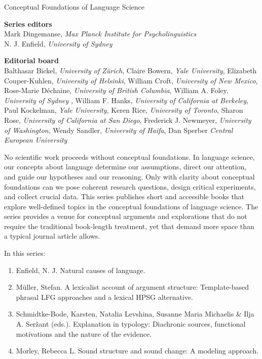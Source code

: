 {\large Conceptual Foundations of Language Science}

\bigskip

\textbf{Series editors}\\
Mark Dingemanse, \textit{Max Planck Institute for Psycholinguistics}   \\
N. J. Enfield, \textit{University of Sydney}


\bigskip


\textbf{Editorial board}\\
Balthasar Bickel, \textit{University of Zürich},
Claire Bowern, \textit{Yale University},
Elizabeth Couper-Kuhlen, \textit{University of Helsinki},
William Croft, \textit{University of New Mexico},
Rose-Marie Déchaine, \textit{University of British Columbia},
William A. Foley, \textit{University of Sydney} ,
William F. Hanks, \textit{University of California at Berkeley},
Paul Kockelman, \textit{Yale University},
Keren Rice, \textit{University of Toronto},
Sharon Rose, \textit{University of California at San Diego},
Frederick J. Newmeyer, \textit{University of Washington},
Wendy Sandler, \textit{University of Haifa},
Dan Sperber \textit{Central European University}

 
\bigskip

\begin{minipage}{\textwidth}%

No scientific work proceeds without conceptual foundations. In language science, our concepts about language determine our assumptions, direct our attention, and guide our hypotheses and our reasoning. Only with clarity about conceptual foundations can we pose coherent research questions, design critical experiments, and collect crucial data.
%
This series publishes short and accessible books that explore well-defined topics in the conceptual foundations of language science. The series provides a venue for conceptual arguments and explorations that do not require the traditional book-length treatment, yet that demand more space than a typical journal article allows.
\end{minipage}

\bigskip
\bigskip

In this series:

\begin{enumerate}
\item Enfield, N. J. {Natural causes of language}.
\item Müller, Stefan. {A lexicalist account of argument structure: Template-based phrasal LFG approaches and a lexical HPSG alternative}.
\item Schmidtke-Bode, Karsten,  Natalia Levshina, Susanne Maria Michaelis \& Ilja A. Seržant (eds.).  Explanation in typology: Diachronic sources, functional motivations and the nature of the evidence.
\item Morley, Rebecca L. Sound structure and sound change: A modeling approach.
\end{enumerate}
